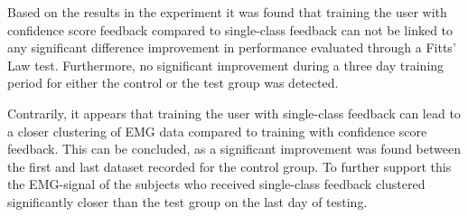 Based on the results in the experiment it was found that training the user with confidence score feedback compared to single-class feedback can not be linked to any significant difference improvement in performance evaluated through a Fitts' Law test. Furthermore, no significant improvement during a three day training period for either the control or the test group was detected. 

Contrarily, it appears that training the user with single-class feedback can lead to a closer clustering of EMG data compared to training with confidence score feedback. This can be concluded, as a significant improvement was found between the first and last dataset recorded for the control group. To further support this the EMG-signal of the subjects who received single-class feedback clustered significantly closer than the test group on the last day of testing.